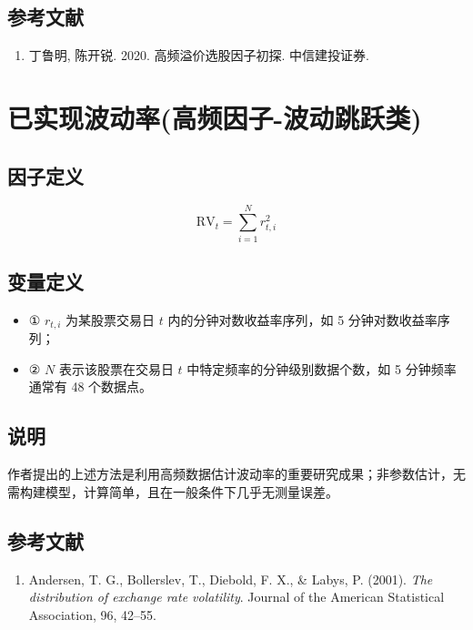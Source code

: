 \documentclass{article}
\begin{document}
\subsection{参考文献}
\begin{enumerate}
    \item 丁鲁明, 陈开锐. 2020. 高频溢价选股因子初探. 中信建投证券.
\end{enumerate}

\section{已实现波动率(高频因子-波动跳跃类)}

\subsection{因子定义}
\begin{equation}
    \mathrm{RV}_t = \sum_{i=1}^N r_{t,i}^2
\end{equation}

\subsection{变量定义}
\begin{itemize}
    \item ① \( r_{t,i} \) 为某股票交易日 \( t \) 内的分钟对数收益率序列，如 5 分钟对数收益率序列；
    \item ② \( N \) 表示该股票在交易日 \( t \) 中特定频率的分钟级别数据个数，如 5 分钟频率通常有 48 个数据点。
\end{itemize}

\subsection{说明}
作者提出的上述方法是利用高频数据估计波动率的重要研究成果；非参数估计，无需构建模型，计算简单，且在一般条件下几乎无测量误差。

\subsection{参考文献}
\begin{enumerate}
    \item Andersen, T. G., Bollerslev, T., Diebold, F. X., \& Labys, P. (2001). \textit{The distribution of exchange rate volatility}. Journal of the American Statistical Association, 96, 42–55.
\end{enumerate}
\end{document}
